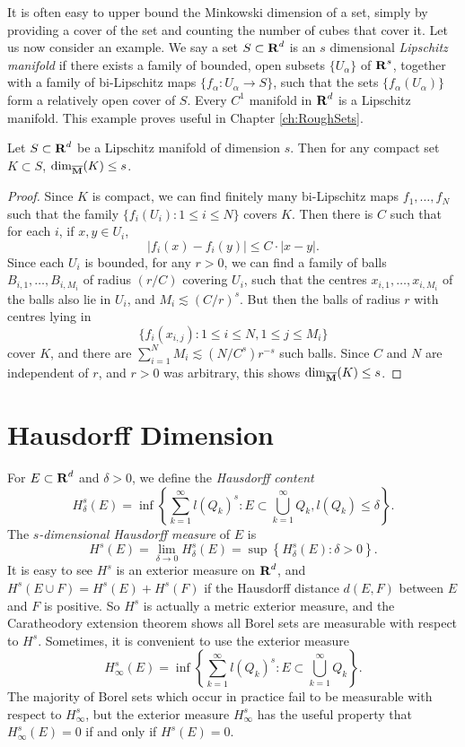 It is often easy to upper bound the Minkowski dimension of a set, simply by providing a cover of the set and counting the number of cubes that cover it. Let us now consider an example. We say a set $S \subset \operatorname{\mathbf{R}}^d$ is an $s$ dimensional \emph{Lipschitz manifold} if there exists a family of bounded, open subsets $\{ U_\alpha \}$ of $\operatorname{\mathbf{R}}^s$, together with a family of bi-Lipschitz maps $\{ f_\alpha: U_\alpha \to S \}$, such that the sets $\{ f_\alpha(U_\alpha) \}$ form a relatively open cover of $S$. Every $C^1$ manifold in $\operatorname{\mathbf{R}}^d$ is a Lipschitz manifold. This example proves useful in Chapter \ref{ch:RoughSets}.

\begin{theorem} \label{ManifoldDimensionThm}
	Let $S \subset \operatorname{\mathbf{R}}^d$ be a Lipschitz manifold of dimension $s$. Then for any compact set $K \subset S$, $\operatorname{\dim_{\overline{\mathbf{M}}}}(K) \leq s$.
\end{theorem}
\begin{proof}
	Since $K$ is compact, we can find finitely many bi-Lipschitz maps $f_1, \dots, f_N$ such that the family $\{ f_i(U_i) : 1 \leq i \leq N \}$ covers $K$. Then there is $C$ such that for each $i$, if $x,y \in U_i$,
	\[ |f_i(x) - f_i(y)| \leq C \cdot |x-y|. \]
	Since each $U_i$ is bounded, for any $r > 0$, we can find a family of balls $B_{i,1}, \dots, B_{i,M_i}$ of radius $(r/C)$ covering $U_i$, such that the centres $x_{i,1}, \dots, x_{i,M_i}$ of the balls also lie in $U_i$, and $M_i \lesssim (C/r)^s$. But then the balls of radius $r$ with centres lying in
	\[ \{ f_i(x_{i,j}) : 1 \leq i \leq N, 1 \leq j \leq M_i \} \]
	cover $K$, and there are $\sum_{i = 1}^N M_i \lesssim (N/C^s) r^{-s}$ such balls. Since $C$ and $N$ are independent of $r$, and $r > 0$ was arbitrary, this shows $\operatorname{\dim_{\overline{\mathbf{M}}}}(K) \leq s$.
\end{proof}

\section{Hausdorff Dimension}

For $E \subset \operatorname{\mathbf{R}}^d$ and $\delta > 0$, we define the \emph{Hausdorff content}
%
\[ H_\delta^s(E) = \inf \left\{ \sum_{k = 1}^\infty l(Q_k)^s : E \subset \bigcup_{k = 1}^\infty Q_k, l(Q_k) \leq \delta \right\}. \]
%
The \emph{$s$-dimensional Hausdorff measure} of $E$ is
%
\[ H^s(E) = \lim_{\delta \to 0} H_\delta^s(E) = \sup \left\{ H^s_\delta(E) : \delta > 0 \right\}. \]
%
It is easy to see $H^s$ is an exterior measure on $\operatorname{\mathbf{R}}^d$, and $H^s(E \cup F) = H^s(E) + H^s(F)$ if the Hausdorff distance $d(E,F)$ between $E$ and $F$ is positive. So $H^s$ is actually a metric exterior measure, and the Caratheodory extension theorem shows all Borel sets are measurable with respect to $H^s$. Sometimes, it is convenient to use the exterior measure
%
\[ H^s_\infty(E) = \inf \left\{ \sum_{k = 1}^\infty l(Q_k)^s : E \subset \bigcup_{k = 1}^\infty Q_k \right\}. \]
%
The majority of Borel sets which occur in practice fail to be measurable with respect to $H^s_\infty$, but the exterior measure $H^s_\infty$ has the useful property that $H^s_\infty(E) = 0$ if and only if $H^s(E) = 0$.

